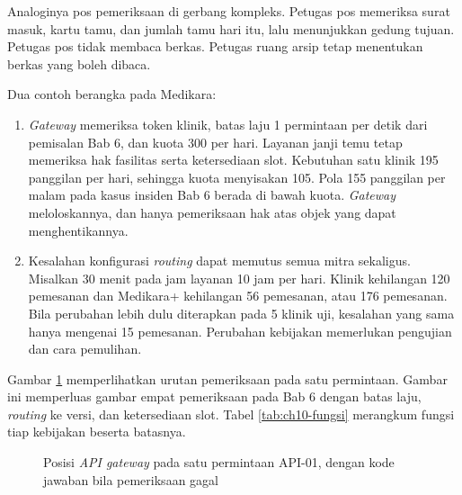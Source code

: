 Analoginya pos pemeriksaan di gerbang kompleks. Petugas pos memeriksa surat masuk, kartu tamu, dan jumlah tamu hari itu,
lalu menunjukkan gedung tujuan. Petugas pos tidak membaca berkas. Petugas ruang arsip tetap menentukan berkas yang boleh
dibaca.

Dua contoh berangka pada Medikara:
\begin{enumerate}
  \item \textit{Gateway} memeriksa token klinik, batas laju 1 permintaan per detik dari pemisalan Bab 6, dan kuota 300
        per hari. Layanan janji temu tetap memeriksa hak fasilitas serta ketersediaan slot. Kebutuhan satu klinik 195
        panggilan per hari, sehingga kuota menyisakan 105. Pola 155 panggilan per malam pada kasus insiden Bab 6 berada
        di bawah kuota. \textit{Gateway} meloloskannya, dan hanya pemeriksaan hak atas objek yang dapat menghentikannya.
  \item Kesalahan konfigurasi \textit{routing} dapat memutus semua mitra sekaligus. Misalkan 30 menit pada jam layanan
        10 jam per hari. Klinik kehilangan 120 pemesanan dan Medikara+ kehilangan 56 pemesanan, atau 176 pemesanan. Bila
        perubahan lebih dulu diterapkan pada 5 klinik uji, kesalahan yang sama hanya mengenai 15 pemesanan. Perubahan
        kebijakan memerlukan pengujian dan cara pemulihan.
\end{enumerate}

Gambar \ref{fig:ch10-posisi} memperlihatkan urutan pemeriksaan pada satu permintaan. Gambar ini memperluas gambar empat
pemeriksaan pada Bab 6 dengan batas laju, \textit{routing} ke versi, dan ketersediaan slot. Tabel \ref{tab:ch10-fungsi}
merangkum fungsi tiap kebijakan beserta batasnya.

\begin{figure}[!htb]
  \centering
  
  \caption{Posisi \textit{API gateway} pada satu permintaan API-01, dengan kode jawaban bila pemeriksaan gagal}
  \label{fig:ch10-posisi}
\end{figure}

